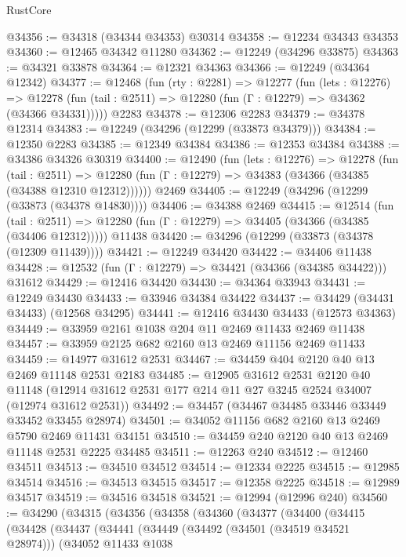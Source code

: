 \begin{lexlean}{RustCore}
\begin{coremodule}
@34356 := @34318 (@34344 @34353) @30314
@34358 := @12234 @34343 @34353
@34360 := @12465 @34342 @11280
@34362 := @12249 (@34296 @33875)
@34363 := @34321 @33878
@34364 := @12321 @34363
@34366 := @12249 (@34364 @12342)
@34377 := @12468
    (fun (rty : @2281) =>
    @12277
      (fun (lets : @12276) =>
      @12278 (fun (tail : @2511) => @12280 (fun (Γ : @12279) => @34362 (@34366 @34331)))))
    @2283
@34378 := @12306 @2283
@34379 := @34378 @12314
@34383 := @12249 (@34296 (@12299 (@33873 @34379)))
@34384 := @12350 @2283
@34385 := @12349 @34384
@34386 := @12353 @34384
@34388 := @34386 @34326 @30319
@34400 := @12490
    (fun (lets : @12276) =>
    @12278
      (fun (tail : @2511) =>
      @12280 (fun (Γ : @12279) => @34383 (@34366 (@34385 (@34388 @12310 @12312))))))
    @2469
@34405 := @12249 (@34296 (@12299 (@33873 (@34378 @14830))))
@34406 := @34388 @2469
@34415 := @12514
    (fun (tail : @2511) => @12280 (fun (Γ : @12279) => @34405 (@34366 (@34385 (@34406 @12312)))))
    @11438
@34420 := @34296 (@12299 (@33873 (@34378 (@12309 @11439))))
@34421 := @12249 @34420
@34422 := @34406 @11438
@34428 := @12532 (fun (Γ : @12279) => @34421 (@34366 (@34385 @34422))) @31612
@34429 := @12416 @34420
@34430 := @34364 @33943
@34431 := @12249 @34430
@34433 := @33946 @34384 @34422
@34437 := @34429 (@34431 @34433) (@12568 @34295)
@34441 := @12416 @34430 @34433 (@12573 @34363)
@34449 := @33959 @2161 @1038 @204 @11 @2469 @11433 @2469 @11438
@34457 := @33959 @2125 @682 @2160 @13 @2469 @11156 @2469 @11433
@34459 := @14977 @31612 @2531
@34467 := @34459 @404 @2120 @40 @13 @2469 @11148 @2531 @2183
@34485 := @12905
    @31612
    @2531
    @2120
    @40
    @11148
    (@12914 @31612 @2531 @177 @214 @11 @27 @3245 @2524 @34007 (@12974 @31612 @2531))
@34492 := @34457 (@34467 @34485 @33446 @33449 @33452 @33455 @28974)
@34501 := @34052 @11156 @682 @2160 @13 @2469 @5790 @2469 @11431 @34151
@34510 := @34459 @240 @2120 @40 @13 @2469 @11148 @2531 @2225 @34485
@34511 := @12263 @240
@34512 := @12460 @34511
@34513 := @34510 @34512
@34514 := @12334 @2225
@34515 := @12985 @34514
@34516 := @34513 @34515
@34517 := @12358 @2225
@34518 := @12989 @34517
@34519 := @34516 @34518
@34521 := @12994 (@12996 @240)
@34560 := @34290
    (@34315
      (@34356
        (@34358
          (@34360
            (@34377
              (@34400
                (@34415
                  (@34428
                    (@34437
                      (@34441
                        (@34449
                          (@34492 (@34501 (@34519 @34521 @28974)))
                          (@34052
                            @11433
                            @1038

\end{coremodule}
\end{lexlean}
